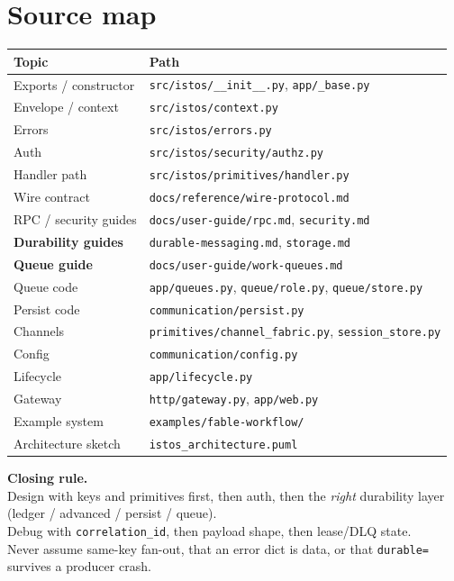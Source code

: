 \documentclass[11pt,a4paper]{article}
\begin{document}
\section{Source map}

\begin{tabularx}{\textwidth}{@{}lX@{}}
\toprule
\textbf{Topic} & \textbf{Path} \\
\midrule
Exports / constructor & \texttt{src/istos/\_\_init\_\_.py}, \texttt{app/\_base.py} \\
Envelope / context & \texttt{src/istos/context.py} \\
Errors & \texttt{src/istos/errors.py} \\
Auth & \texttt{src/istos/security/authz.py} \\
Handler path & \texttt{src/istos/primitives/handler.py} \\
Wire contract & \texttt{docs/reference/wire-protocol.md} \\
RPC / security guides & \texttt{docs/user-guide/rpc.md}, \texttt{security.md} \\
\textbf{Durability guides} & \texttt{durable-messaging.md}, \texttt{storage.md} \\
\textbf{Queue guide} & \texttt{docs/user-guide/work-queues.md} \\
Queue code & \texttt{app/queues.py}, \texttt{queue/role.py}, \texttt{queue/store.py} \\
Persist code & \texttt{communication/persist.py} \\
Channels & \texttt{primitives/channel\_fabric.py}, \texttt{session\_store.py} \\
Config & \texttt{communication/config.py} \\
Lifecycle & \texttt{app/lifecycle.py} \\
Gateway & \texttt{http/gateway.py}, \texttt{app/web.py} \\
Example system & \texttt{examples/fable-workflow/} \\
Architecture sketch & \texttt{istos\_architecture.puml} \\
\bottomrule
\end{tabularx}

\vspace{1.2em}
\begin{center}
\begin{tcolorbox}[colback=istosblue!5, colframe=istosblue!60, width=0.95\textwidth]
\centering
\textbf{Closing rule.}\\[0.35em]
Design with keys and primitives first, then auth, then the \emph{right}
durability layer (ledger / advanced / persist / queue).\\
Debug with \texttt{correlation\_id}, then payload shape, then lease/DLQ state.\\
Never assume same-key fan-out, that an error dict is data, or that
\texttt{durable=} survives a producer crash.
\end{tcolorbox}
\end{center}
\end{document}

